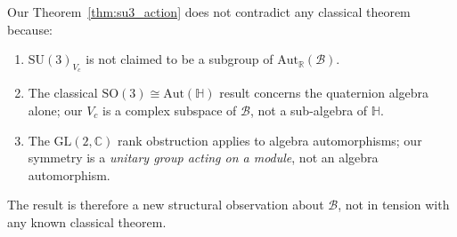 Our Theorem~\ref{thm:su3_action} does not contradict any classical theorem
because:
\begin{enumerate}
  \item $\mathrm{SU}(3)_{V_c}$ is not claimed to be a subgroup of
    $\mathrm{Aut}_\mathbb{R}(\mathcal{B})$.
  \item The classical $\mathrm{SO}(3)\cong\mathrm{Aut}(\mathbb{H})$ result
    concerns the quaternion algebra alone; our $V_c$ is a complex subspace of
    $\mathcal{B}$, not a sub-algebra of $\mathbb{H}$.
  \item The $\mathrm{GL}(2,\mathbb{C})$ rank obstruction applies to algebra
    automorphisms; our symmetry is a \emph{unitary group acting on a module},
    not an algebra automorphism.
\end{enumerate}

The result is therefore a new structural observation about $\mathcal{B}$, not
in tension with any known classical theorem.
